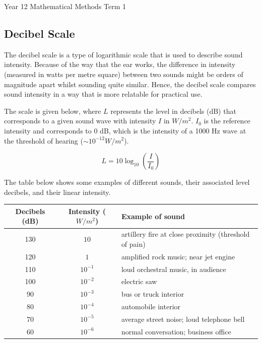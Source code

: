 \documentclass[12pt]{article}
\begin{document}
\newpage
\noindent Year 12 Mathematical Methods \hfill Term 1

\subsection*{Decibel Scale}

The decibel scale is a type of logarithmic scale that is used to describe sound intensity. Because of the way that the ear works, the difference in intensity (measured in watts per metre square) between two sounds might be orders of magnitude apart whilst sounding quite similar. Hence, the decibel scale compares sound intensity in a way that is more relatable for practical use.
\vspace{10pt}

The scale is given below, where \( L \) represents the level in decibels (dB) that corresponds to a given sound wave with intensity \( I \) in \( W/m^2 \). \( I_0 \) is the reference intensity and corresponds to 0 dB, which is the intensity of a 1000 Hz wave at the threshold of hearing (\( \sim 10^{-12} W/m^2 \)).

\[
L = 10 \log_{10} \left( \frac{I}{I_0} \right)
\]

The table below shows some examples of different sounds, their associated level decibels, and their linear intensity.

\begin{center}
\begin{tabular}{|c|c|l|}
\hline
\textbf{Decibels (dB)} & \textbf{Intensity} (\( W/m^2 \)) & \textbf{Example of sound} \\
\hline
130 & \( 10 \) & artillery fire at close proximity (threshold of pain) \\
120 & \( 1 \) & amplified rock music; near jet engine \\
110 & \( 10^{-1} \) & loud orchestral music, in audience \\
100 & \( 10^{-2} \) & electric saw \\
90 & \( 10^{-3} \) & bus or truck interior \\
80 & \( 10^{-4} \) & automobile interior \\
70 & \( 10^{-5} \) & average street noise; loud telephone bell \\
60 & \( 10^{-6} \) & normal conversation; business office \\
\hline
\end{tabular}
\end{center}
\end{document}
